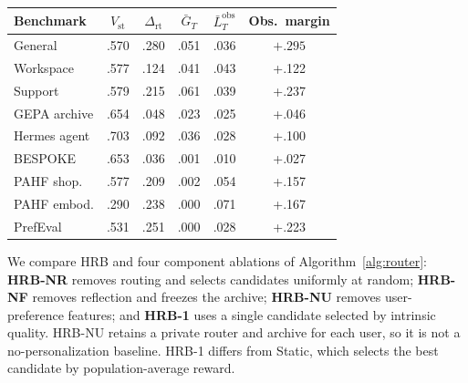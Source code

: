 \documentclass{article} %
\begin{document}
\begin{table}[t]
\begin{minipage}[t]{0.48\textwidth}
\end{minipage}
\hfill
\begin{minipage}[t]{0.50\textwidth}
\vspace{0pt}
\centering
\captionsetup{justification=raggedright,singlelinecheck=false}
\label{tab:main}\label{tab:e6-decomp}
\begingroup
\scriptsize
\setlength{\tabcolsep}{2.5pt}
\begin{tabular}{lccccc}
\toprule
\textbf{Benchmark} & $V_{\mathrm{st}}$ & $\Delta_{\mathrm{rt}}$ & $\bar G_T$ & $\bar L_T^{\mathrm{obs}}$ & \textbf{Obs.\ margin} \\
\midrule
General       & .570 & .280 & .051 & .036 & $\mathbf{+.295}$ \\
Workspace     & .577 & .124 & .041 & .043 & +.122 \\
Support       & .579 & .215 & .061 & .039 & +.237 \\
GEPA archive  & .654 & .048 & .023 & .025 & +.046 \\
Hermes agent  & .703 & .092 & .036 & .028 & +.100 \\
BESPOKE       & .653 & .036 & .001 & .010 & +.027 \\
PAHF shop.    & .577 & .209 & .002 & .054 & +.157 \\
PAHF embod.   & .290 & .238 & .000 & .071 & +.167 \\
PrefEval      & .531 & .251 & .000 & .028 & +.223 \\
\bottomrule
\end{tabular}
\endgroup

\end{minipage}
\end{table}

We compare HRB and four component ablations of Algorithm~\ref{alg:router}: \textbf{HRB-NR} removes routing and selects candidates uniformly at random; \textbf{HRB-NF} removes reflection and freezes the archive; \textbf{HRB-NU} removes user-preference features; and \textbf{HRB-1} uses a single candidate selected by intrinsic quality. HRB-NU retains a private router and archive for each user, so it is not a no-personalization baseline. HRB-1 differs from Static, which selects the best candidate by population-average reward.
\end{document}
